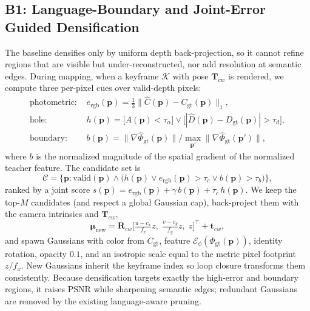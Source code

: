 \documentclass[10pt, journal]{IEEEtran}
\begin{document}
\subsection{B1: Language-Boundary and Joint-Error Guided Densification}\label{sec:b1}
The baseline densifies only by uniform depth back-projection, so it cannot refine
regions that are visible but under-reconstructed, nor add resolution at semantic
edges. During mapping, when a keyframe $\mathcal{K}$ with pose $\mathbf{T}_{cw}$ is
rendered, we compute three per-pixel cues over valid-depth pixels:
\begin{align}
\text{photometric: } & e_{\text{rgb}}(\mathbf{p}) = \tfrac{1}{3}\|\hat{C}(\mathbf{p})-C_{\text{gt}}(\mathbf{p})\|_1,\\
\text{hole: } & h(\mathbf{p}) = \big[A(\mathbf{p})\!<\!\tau_\alpha\big] \vee \big[|\hat{D}(\mathbf{p})\!-\!D_{\text{gt}}(\mathbf{p})|\!>\!\tau_d\big],\\
\text{boundary: } & b(\mathbf{p}) = \big\|\nabla \hat{\Phi}_{\text{gt}}(\mathbf{p})\big\|\big/\textstyle\max_{\mathbf{p}'}\|\nabla \hat{\Phi}_{\text{gt}}(\mathbf{p}')\|,
\end{align}
where $b$ is the normalized magnitude of the spatial gradient of the normalized
teacher feature. The candidate set is
\begin{equation}
\mathcal{C} = \big\{\mathbf{p}: \text{valid}(\mathbf{p}) \wedge \big(h(\mathbf{p}) \vee e_{\text{rgb}}(\mathbf{p})\!>\!\tau_c \vee b(\mathbf{p})\!>\!\tau_b\big)\big\},
\end{equation}
ranked by a joint score $s(\mathbf{p})=e_{\text{rgb}}(\mathbf{p})+\gamma\, b(\mathbf{p})+\tau_c\,h(\mathbf{p})$.
We keep the top-$M$ candidates (and respect a global Gaussian cap), back-project
them with the camera intrinsics and $\mathbf{T}_{cw}$,
\begin{equation}
\boldsymbol{\mu}_{\text{new}} = \mathbf{R}_{cw}\Big[\tfrac{u-c_x}{f_x}z,\; \tfrac{v-c_y}{f_y}z,\; z\Big]^{\!\top} + \mathbf{t}_{cw},
\end{equation}
and spawn Gaussians with color from $C_{\text{gt}}$, feature
$\mathcal{E}_\phi(\Phi_{\text{gt}}(\mathbf{p}))$, identity rotation, opacity $0.1$,
and an isotropic scale equal to the metric pixel footprint $z/f_x$. New Gaussians
inherit the keyframe index so loop closure transforms them consistently. Because
densification targets exactly the high-error and boundary regions, it raises PSNR
while sharpening semantic edges; redundant Gaussians are removed by the existing
language-aware pruning.
\end{document}
